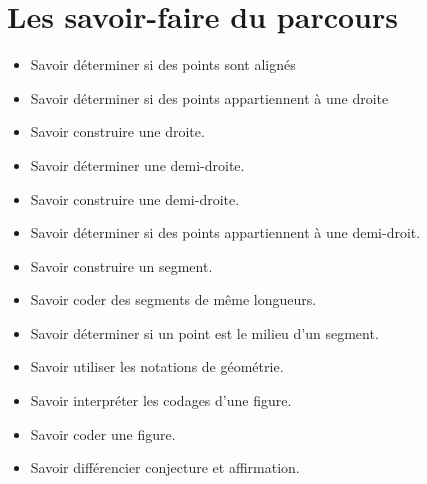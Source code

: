 \documentclass[a4paper,dvipsnames]{article}
\begin{document}
\section{Les savoir-faire du parcours}

\begin{CpsCol}
\begin{itemize}
\item Savoir déterminer si des points sont alignés
\item Savoir déterminer si des points appartiennent à une droite
\item Savoir construire une droite.       
\item Savoir déterminer une demi-droite.
\item Savoir construire une demi-droite.   
\item Savoir déterminer si des points appartiennent à une demi-droit.
\item Savoir construire un segment.
\item Savoir coder des segments de même longueurs.
\item Savoir déterminer si un point est le milieu d'un segment.
\item Savoir utiliser les notations de géométrie.
\item Savoir interpréter les codages d'une figure.
\item Savoir coder une figure.
\item Savoir différencier conjecture et affirmation.
\end{itemize}
\end{CpsCol}
\end{document}
